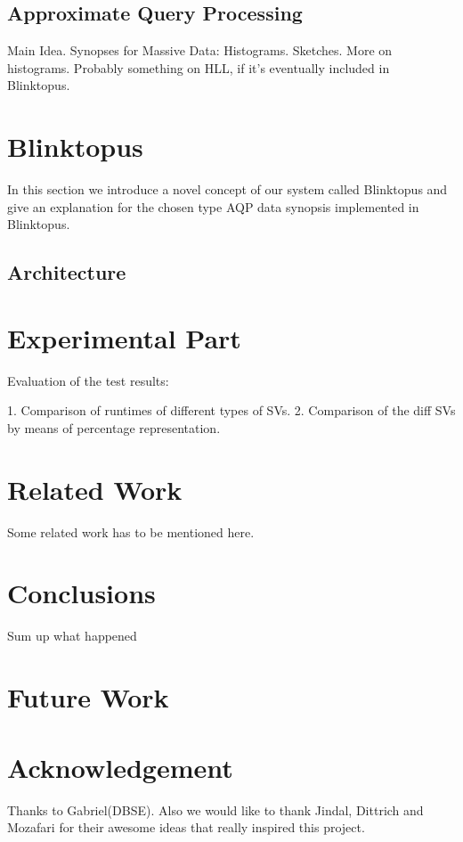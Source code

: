 \documentclass[10pt, conference, compsocconf]{IEEEtran}
\begin{document}
\subsection{Approximate Query Processing}
Main Idea. Synopses for Massive Data: Histograms. Sketches.
More on histograms. 
Probably something on HLL, if it's eventually included in Blinktopus.

\section{Blinktopus}
In this section we introduce a novel concept of our system called Blinktopus and give an explanation for the chosen type AQP data synopsis implemented in Blinktopus.  
\subsection{Architecture}

\section{Experimental Part}
Evaluation of the test results:
 
1. Comparison of runtimes of different types of SVs.
2. Comparison of the diff SVs by means of percentage representation.

\section{Related Work}
Some related work has to be mentioned here.

\section{Conclusions}
Sum up what happened

\section{Future Work}


\section*{Acknowledgement}
Thanks to Gabriel(DBSE). Also we would like to thank Jindal, Dittrich and Mozafari for their awesome ideas that really inspired this project.
\end{document}
